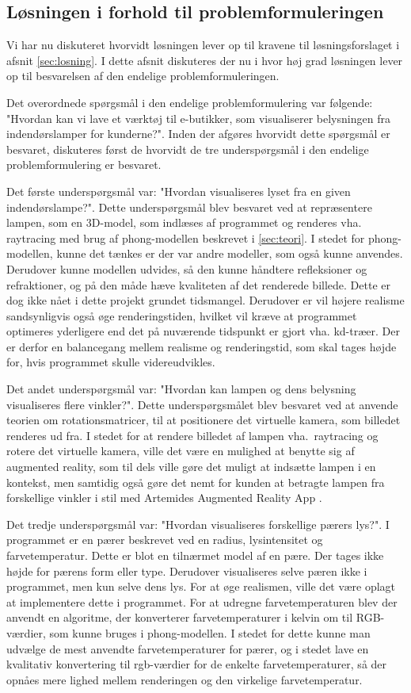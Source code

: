 \subsection{Løsningen i forhold til problemformuleringen}
 Vi har nu diskuteret hvorvidt løsningen lever op til kravene til løsningsforslaget i afsnit \ref{sec:losning}. I dette afsnit diskuteres der nu i hvor høj grad løsningen lever op til besvarelsen af den endelige problemformuleringen.

Det overordnede spørgsmål i den endelige problemformulering var følgende: "Hvordan kan vi lave et værktøj til e-butikker, som visualiserer belysningen fra indendørslamper for kunderne?". Inden  der afgøres hvorvidt dette spørgsmål er besvaret, diskuteres først de hvorvidt de tre underspørgsmål i den endelige problemformulering er besvaret.

Det første underspørgsmål var: "Hvordan visualiseres lyset fra en given indendørslampe?". Dette underspørgsmål blev besvaret ved at repræsentere lampen, som en 3D-model, som indlæses af programmet og renderes vha. raytracing med brug af phong-modellen beskrevet i \ref{sec:teori}. I stedet for phong-modellen, kunne det tænkes er der var andre modeller, som også kunne anvendes. Derudover kunne modellen udvides, så den kunne håndtere refleksioner og refraktioner, og på den måde hæve kvaliteten af det renderede billede. Dette er dog ikke nået i dette projekt grundet tidsmangel. Derudover er vil højere realisme sandsynligvis også øge renderingstiden, hvilket vil kræve at programmet optimeres yderligere end det på nuværende tidspunkt er gjort vha. kd-træer. Der er derfor en balancegang mellem realisme og renderingstid, som skal tages højde for, hvis programmet skulle videreudvikles.

Det andet underspørgsmål var: "Hvordan kan lampen og dens belysning visualiseres flere vinkler?". Dette underspørgsmålet blev besvaret ved at anvende teorien om rotationsmatricer, til at positionere det virtuelle kamera, som billedet renderes ud fra. I stedet for at rendere billedet af lampen vha.\ raytracing og rotere det virtuelle kamera, ville det være en mulighed at benytte sig af augmented reality, som til dels ville gøre det muligt at indsætte lampen i en kontekst, men samtidig også gøre det nemt for kunden at betragte lampen fra forskellige vinkler i stil med Artemides Augmented Reality App \cite{artemides}. 

Det tredje underspørgsmål var: "Hvordan visualiseres forskellige pærers lys?". I programmet er en pærer beskrevet ved en radius, lysintensitet og farvetemperatur. Dette er blot en tilnærmet model af en pære. Der tages ikke højde for pærens form eller type. Derudover visualiseres selve pæren ikke i programmet, men kun selve dens lys. For at øge realismen, ville det være oplagt at implementere dette i programmet. 
For at udregne farvetemperaturen blev der anvendt en algoritme, der konverterer farvetemperaturer i kelvin om til RGB-værdier, som kunne bruges i phong-modellen. I stedet for dette kunne man udvælge de mest anvendte farvetemperaturer for pærer, og i stedet lave en kvalitativ konvertering til rgb-værdier for de enkelte farvetemperaturer, så der opnåes mere lighed mellem renderingen og den virkelige farvetemperatur.

